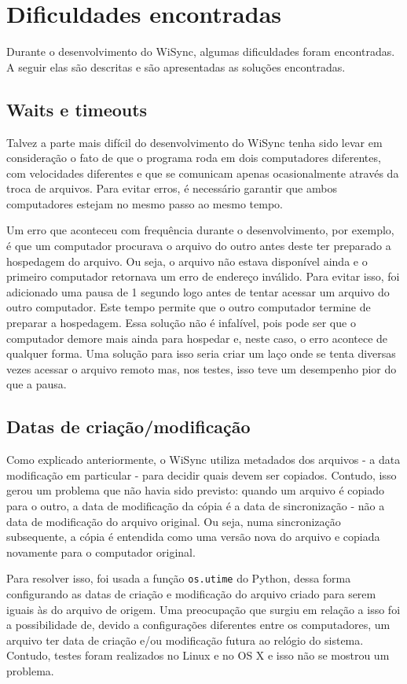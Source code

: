 \documentclass[12pt,a4paper]{ufpr}
\begin{document}
\section{Dificuldades encontradas}
Durante o desenvolvimento do WiSync, algumas dificuldades foram encontradas.
A seguir elas são descritas e são apresentadas as soluções encontradas.

\subsection{Waits e timeouts}
Talvez a parte mais difícil do desenvolvimento do WiSync tenha sido levar em consideração o fato de que o programa roda em dois computadores diferentes, com velocidades diferentes e que se comunicam apenas ocasionalmente através da troca de arquivos.
Para evitar erros, é necessário garantir que ambos computadores estejam no mesmo passo ao mesmo tempo.

Um erro que aconteceu com frequência durante o desenvolvimento, por exemplo, é que um computador procurava o arquivo do outro antes deste ter preparado a hospedagem do arquivo.
Ou seja, o arquivo não estava disponível ainda e o primeiro computador retornava um erro de endereço inválido.
Para evitar isso, foi adicionado uma pausa de 1 segundo logo antes de tentar acessar um arquivo do outro computador.
Este tempo permite que o outro computador termine de preparar a hospedagem.
Essa solução não é infalível, pois pode ser que o computador demore mais ainda para hospedar e, neste caso, o erro acontece de qualquer forma.
Uma solução para isso seria criar um laço onde se tenta diversas vezes acessar o arquivo remoto mas, nos testes, isso teve um desempenho pior do que a pausa.

\subsection{Datas de criação/modificação}
Como explicado anteriormente, o WiSync utiliza metadados dos arquivos \-- a data modificação em particular \-- para decidir quais devem ser copiados.
Contudo, isso gerou um problema que não havia sido previsto: quando um arquivo é copiado para o outro, a data de modificação da cópia é a data de sincronização \-- não a data de modificação do arquivo original.
Ou seja, numa sincronização subsequente, a cópia é entendida como uma versão nova do arquivo e copiada novamente para o computador original.

Para resolver isso, foi usada a função \texttt{os.utime} do Python, dessa forma configurando as datas de criação e modificação do arquivo criado para serem iguais às do arquivo de origem. Uma preocupação que surgiu em relação a isso foi a possibilidade de, devido a configurações diferentes entre os computadores, um arquivo ter data de criação e/ou modificação futura ao relógio do sistema.
Contudo, testes foram realizados no Linux e no OS X e isso não se mostrou um problema.
\end{document}
